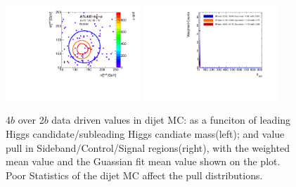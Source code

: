 \begin{figure}[htbp!]
\begin{center}
\includegraphics[angle=270, width=0.45\textwidth]{./figures/boosted/AppendixMuqcdstudy/QCD_FourTag_Incl_mH0H1.pdf}
\includegraphics[angle=270, width=0.45\textwidth]{./figures/boosted/AppendixMuqcdstudy/QCD_FourTag_Incl_mH0H1_pull.pdf}
\caption{4$b$ over 2$b$ data driven \muqcd values in dijet MC: \muqcd as a funciton of leading Higgs candidate/subleading Higgs candiate mass(left); and \muqcd value pull in Sideband/Control/Signal regions(right), with the weighted mean value and the Guassian fit mean value shown on the plot. Poor Statistics of the dijet MC affect the pull distributions.}
\label{fig:app-muqcd-4b-qcd}
\end{center}
\end{figure}


